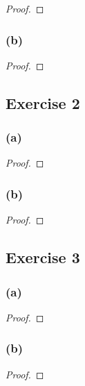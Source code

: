 \documentclass[14pt]{extarticle}
\begin{document}
\begin{proof}

\end{proof}

\subsubsection{(b)}

\begin{proof}

\end{proof}

\subsection{Exercise 2}

\subsubsection{(a)}

\begin{proof}

\end{proof}

\subsubsection{(b)}

\begin{proof}

\end{proof}

\subsection{Exercise 3}

\subsubsection{(a)}

\begin{proof}

\end{proof}

\subsubsection{(b)}

\begin{proof}

\end{proof}
\end{document}
